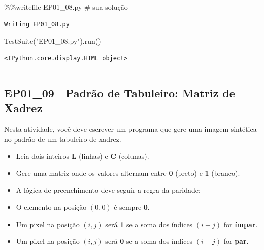\documentclass[
  portuguese,
  letterpaper,
  openany,
  oneside,
  12pt,
  a4paper]{book}
\newenvironment{Shaded}{\begin{snugshade}}{\end{snugshade}}
\newcommand{\CommentTok}[1]{\textcolor[rgb]{0.37,0.37,0.37}{#1}}
\newcommand{\NormalTok}[1]{\textcolor[rgb]{0.00,0.23,0.31}{#1}}
\newcommand{\OperatorTok}[1]{\textcolor[rgb]{0.37,0.37,0.37}{#1}}
\newcommand{\StringTok}[1]{\textcolor[rgb]{0.13,0.47,0.30}{#1}}
\providecommand{\tightlist}{%
  \setlength{\itemsep}{0pt}\setlength{\parskip}{0pt}}
\begin{document}
\begin{Shaded}
\begin{Highlighting}[]
\OperatorTok{\%\%}\NormalTok{writefile EP01\_08.py}
\CommentTok{\# sua solução}
\end{Highlighting}
\end{Shaded}

\begin{verbatim}
Writing EP01_08.py
\end{verbatim}

\begin{Shaded}
\begin{Highlighting}[]
\NormalTok{TestSuite(}\StringTok{"EP01\_08.py"}\NormalTok{).run()}
\end{Highlighting}
\end{Shaded}

\begin{verbatim}
<IPython.core.display.HTML object>
\end{verbatim}

\begin{center}\rule{0.5\linewidth}{0.5pt}\end{center}

\subsection{EP01\_09 🏁 Padrão de Tabuleiro: Matriz de
Xadrez}\label{ep01_09-padruxe3o-de-tabuleiro-matriz-de-xadrez}

Nesta atividade, você deve escrever um programa que gere uma imagem
sintética no padrão de um tabuleiro de xadrez.

\begin{itemize}
\tightlist
\item
  Leia dois inteiros \textbf{L} (linhas) e \textbf{C} (colunas).
\item
  Gere uma matriz onde os valores alternam entre \textbf{0} (preto) e
  \textbf{1} (branco).
\item
  A lógica de preenchimento deve seguir a regra da paridade:
\item
  O elemento na posição \((0,0)\) é sempre \textbf{0}.
\item
  Um pixel na posição \((i, j)\) será \textbf{1} se a soma dos índices
  \((i + j)\) for \textbf{ímpar}.
\item
  Um pixel na posição \((i, j)\) será \textbf{0} se a soma dos índices
  \((i + j)\) for \textbf{par}.
\end{itemize}
\end{document}

